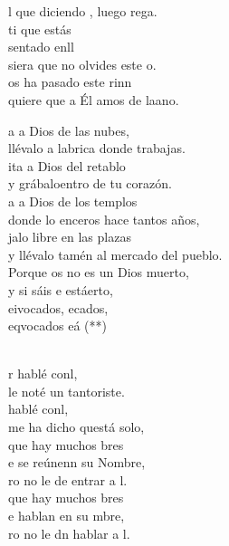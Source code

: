 \documentclass[12pt]{article}
\begin{document}
\begin{multicols*}{2}
\begin{cancion}
	l que diciendo , luego rega.\\
	ti que estás \\
	sentado enll  \\
	siera que no olvides este o.\\
	os ha pasado  este rinn \\
	quiere que a Él amos de laano.\\
\end{cancion}%

\begin{cancion}%
	\begin{chorus}%
	a a Dios de las nubes,\\
	llévalo a labrica donde trabajas. \\
	ita a Dios del retablo\\
	y grábaloentro de tu corazón.\\
	a a Dios de los templos\\
	donde lo enceros hace tantos años,\\
	jalo libre en las plazas \\
	y llévalo tamén al mercado del pueblo.\\
	Porque os no es un Dios muerto,\\
	y si sáis e estáerto, \\
	eivocados, ecados,\\
	eqvocados eá (**)\\
	\end{chorus}%
	\jump\\
	r hablé conl,\\
	le noté un tantoriste.\\
	 hablé conl,\\
	me ha dicho questá solo,\\
	que hay muchos bres\\
	e se reúnenn su Nombre,\\
	ro no le de entrar a l.\\
	que hay muchos bres\\
	e hablan en su mbre,\\
	ro no le dn hablar a l.\\
\end{cancion}%


\end{multicols*}
\end{document}
